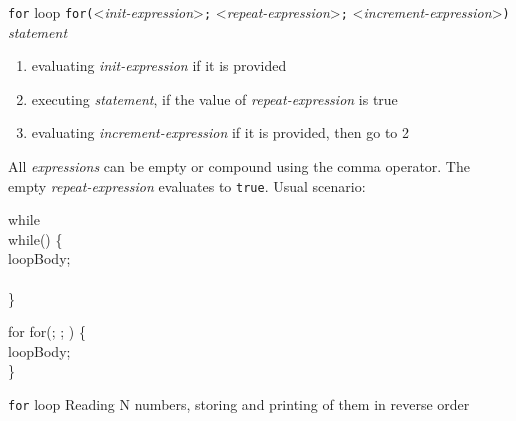 \documentclass[usenames,dvipsnames,aspectratio=169]{beamer}
\begin{document}
\begin{frame}{\texttt{for} loop}
  \scriptsize
  \texttt{for(}<\emph{init-expression}>\texttt{;} <\emph{repeat-expression}>\texttt{;} <\emph{increment-expression}>\texttt{)} 
\emph{statement}
  \begin{enumerate}
    \item evaluating \emph{init-expression} if it is provided
    \item executing \emph{statement}, if the value of \emph{repeat-expression} is true
    \item evaluating \emph{increment-expression} if it is provided, then go to 2
  \end{enumerate}
  All \emph{expressions} can be empty or compound using the comma operator. The empty \emph{repeat-expression} evaluates to \texttt{true}.
  Usual scenario:
  \begin{exampleblock}{while}
    \\
    while() \{\\
      \hspace{0.5cm} loopBody;\\
      \hspace{0.5cm} \\
    \}\\
  \end{exampleblock}
  \begin{exampleblock}{for}
    for(; ; ) \{\\
      \hspace{0.5cm} loopBody;\\
    \}\\
  \end{exampleblock}
\end{frame}

\begin{frame}{\texttt{for} loop}
  Reading N numbers, storing and printing of them in reverse order
  \begin{columns}[T]
      \begin{exampleblock}{}
        \tiny
        
      \end{exampleblock}
      \begin{exampleblock}{}
        \tiny
        
      \end{exampleblock}
  \end{columns}
\end{frame}
\end{document}
